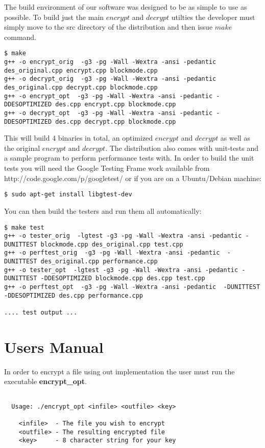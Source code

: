 \documentclass[10pt]{article}
\begin{document}
  The build environment of our software was designed to be as simple to use as possible.
  To build just the main $encrypt$ and $decrypt$ utilties the developer must simply move to the src directory of the distribution and then issue $make$ command.

{\footnotesize
\begin{verbatim}
$ make
g++ -o encrypt_orig  -g3 -pg -Wall -Wextra -ansi -pedantic des_original.cpp encrypt.cpp blockmode.cpp
g++ -o decrypt_orig  -g3 -pg -Wall -Wextra -ansi -pedantic des_original.cpp decrypt.cpp blockmode.cpp
g++ -o encrypt_opt  -g3 -pg -Wall -Wextra -ansi -pedantic -DDESOPTIMIZED des.cpp encrypt.cpp blockmode.cpp
g++ -o decrypt_opt  -g3 -pg -Wall -Wextra -ansi -pedantic -DDESOPTIMIZED des.cpp decrypt.cpp blockmode.cpp
\end{verbatim}
}

  This will build 4 binaries in total, an optimized $encrypt$ and $decrypt$ as well as the original $encrypt$ and $decrypt$.
  The distribution also comes with unit-tests and a sample program to perform performance tests with.
  In order to build the unit tests you will need the Google Testing Frame work available from http://code.google.com/p/googletest/ or if you are
  on a Ubuntu/Debian machine:

{\footnotesize
\begin{verbatim}
$ sudo apt-get install libgtest-dev
\end{verbatim}
}

You can then build the testers and run them all automatically:

{\footnotesize
\begin{verbatim}
$ make test
g++ -o tester_orig  -lgtest -g3 -pg -Wall -Wextra -ansi -pedantic -DUNITTEST blockmode.cpp des_original.cpp test.cpp
g++ -o perftest_orig  -g3 -pg -Wall -Wextra -ansi -pedantic  -DUNITTEST des_original.cpp performance.cpp
g++ -o tester_opt  -lgtest -g3 -pg -Wall -Wextra -ansi -pedantic -DUNITTEST -DDESOPTIMIZED blockmode.cpp des.cpp test.cpp
g++ -o perftest_opt  -g3 -pg -Wall -Wextra -ansi -pedantic  -DUNITTEST -DDESOPTIMIZED des.cpp performance.cpp

.... test output ...
\end{verbatim}
}

\section{Users Manual}

In order to encrypt a file using out implementation the user must run the executable \textbf{encrypt\_opt}.
\begin{verbatim}

  Usage: ./encrypt_opt <infile> <outfile> <key>

    <infile>  - The file you wish to encrypt
    <outfile> - The resulting encrypted file
    <key>     - 8 character string for your key

\end{verbatim}
\end{document}

